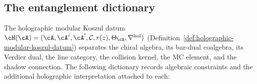 %
%

\subsection{The entanglement dictionary}
\label{subsec:thqg-entanglement-dictionary}

The holographic modular Koszul datum
$\cH(\cA) = (\cA, \cA^i, \cA^!, \mathcal{C}, r(z), \Theta_\cA,
\nabla^{\mathrm{hol}})$
(Definition~\ref{def:holographic-modular-koszul-datum}) separates the chiral
algebra, its bar-dual coalgebra, its Verdier dual, the line category,
the collision kernel, the MC element, and the shadow connection.  The
following dictionary records algebraic constraints and the additional
holographic interpretation attached to each:

